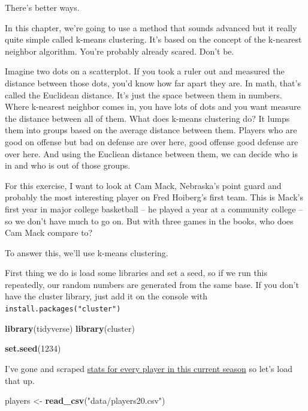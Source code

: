 \documentclass[]{book}
\newenvironment{Shaded}{\begin{snugshade}}{\end{snugshade}}
\newcommand{\DecValTok}[1]{\textcolor[rgb]{0.00,0.00,0.81}{#1}}
\newcommand{\KeywordTok}[1]{\textcolor[rgb]{0.13,0.29,0.53}{\textbf{#1}}}
\newcommand{\NormalTok}[1]{#1}
\newcommand{\StringTok}[1]{\textcolor[rgb]{0.31,0.60,0.02}{#1}}
\begin{document}
There's better ways.

In this chapter, we're going to use a method that sounds advanced but it really quite simple called k-means clustering. It's based on the concept of the k-nearest neighbor algorithm. You're probably already scared. Don't be.

Imagine two dots on a scatterplot. If you took a ruler out and measured the distance between those dots, you'd know how far apart they are. In math, that's called the Euclidean distance. It's just the space between them in numbers. Where k-nearest neighbor comes in, you have lots of dots and you want measure the distance between all of them. What does k-means clustering do? It lumps them into groups based on the average distance between them. Players who are good on offense but bad on defense are over here, good offense good defense are over here. And using the Eucliean distance between them, we can decide who is in and who is out of those groups.

For this exercise, I want to look at Cam Mack, Nebraska's point guard and probably the most interesting player on Fred Hoiberg's first team. This is Mack's first year in major college basketball -- he played a year at a community college -- so we don't have much to go on. But with three games in the books, who does Cam Mack compare to?

To answer this, we'll use k-means clustering.

First thing we do is load some libraries and set a seed, so if we run this repeatedly, our random numbers are generated from the same base. If you don't have the cluster library, just add it on the console with \texttt{install.packages("cluster")}

\begin{Shaded}
\begin{Highlighting}[]
\KeywordTok{library}\NormalTok{(tidyverse)}
\KeywordTok{library}\NormalTok{(cluster)}

\KeywordTok{set.seed}\NormalTok{(}\DecValTok{1234}\NormalTok{)}
\end{Highlighting}
\end{Shaded}

I've gone and scraped \href{https://unl.box.com/s/0g56ve61y6hakyxzr1u4t534721bqvg8}{stats for every player in this current season} so let's load that up.

\begin{Shaded}
\begin{Highlighting}[]
\NormalTok{players <-}\StringTok{ }\KeywordTok{read_csv}\NormalTok{(}\StringTok{"data/players20.csv"}\NormalTok{)}
\end{Highlighting}
\end{Shaded}
\end{document}
